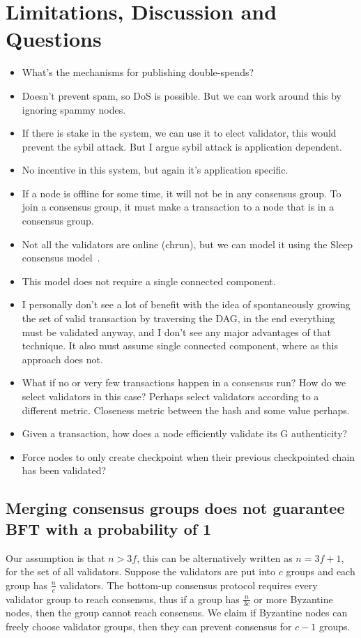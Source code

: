 \section{Limitations, Discussion and Questions}
\begin{itemize}
\item What's the mechanisms for publishing double-spends?
\item Doesn't prevent spam, so DoS is possible. But we can work around this by
  ignoring spammy nodes.
\item If there is stake in the system, we can use it to elect validator, this
  would prevent the sybil attack. But I argue sybil attack is application
  dependent.
\item No incentive in this system, but again it's application specific.
\item If a node is offline for some time, it will not be in any consensus group.
  To join a consensus group, it must make a transaction to a node that is in a
  consensus group.
\item Not all the validators are online (chrun), but we can model it using the
  Sleep consensus model~\cite{bentov2016sleepy}.
\item This model does not require a single connected component. 
\item I personally don't see a lot of benefit with the idea of spontaneously
  growing the set of valid transaction by traversing the DAG, in the end
  everything must be validated anyway, and I don't see any major advantages of
  that technique. It also must assume single connected component, where as this
  approach does not.
\item What if no or very few transactions happen in a consensus run? How do we
  select validators in this case? Perhaps select validators according to a
  different metric. Closeness metric between the hash and some value perhaps.
\item Given a transaction, how does a node efficiently validate its G
  authenticity?
\item Force nodes to only create checkpoint when their previous checkpointed
  chain has been validated?
\end{itemize}

\subsection{Merging consensus groups does not guarantee BFT with a probability
  of 1}
Our assumption is that $n > 3f$, this can be alternatively written as $n = 3f +
1$, for the set of all validators. Suppose the validators are put into $c$
groups and each group has $\frac{n}{c}$ validators. The bottom-up consensus
protocol requires every validator group to reach consensus, thus if a group has
$\frac{n}{3c}$ or more Byzantine nodes, then the group cannot reach consensus.
We claim if Byzantine nodes can freely choose validator groups, then they can
prevent consensus for $c-1$ groups.

